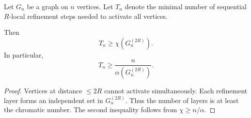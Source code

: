 \begin{theorem}
Let $G_n$ be a graph on $n$ vertices.
Let $T_n$ denote the minimal number of sequential $R$-local refinement steps
needed to activate all vertices.

Then
\[
T_n \ge \chi(G_n^{(2R)}).
\]
In particular,
\[
T_n \ge \frac{n}{\alpha(G_n^{(2R)})}.
\]
\end{theorem}

\begin{proof}
Vertices at distance $\le 2R$ cannot activate simultaneously.
Each refinement layer forms an independent set in $G_n^{(2R)}$.
Thus the number of layers is at least the chromatic number.
The second inequality follows from $\chi \ge n/\alpha$.
\end{proof}
